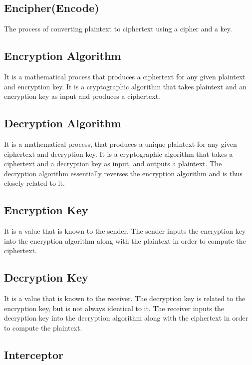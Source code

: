 \documentclass[british]{article}
\begin{document}
\subsection{Encipher(Encode)}

The process of converting plaintext to ciphertext using a cipher and
a key.

\subsection{Encryption Algorithm}

It is a mathematical process that produces a ciphertext for any given
plaintext and encryption key. It is a cryptographic algorithm that
takes plaintext and an encryption key as input and produces a ciphertext.

\subsection{Decryption Algorithm}

It is a mathematical process, that produces a unique plaintext for
any given ciphertext and decryption key. It is a cryptographic algorithm
that takes a ciphertext and a decryption key as input, and outputs
a plaintext. The decryption algorithm essentially reverses the encryption
algorithm and is thus closely related to it.

\subsection{Encryption Key}

It is a value that is known to the sender. The sender inputs the encryption
key into the encryption algorithm along with the plaintext in order
to compute the ciphertext.

\subsection{Decryption Key}

It is a value that is known to the receiver. The decryption key is
related to the encryption key, but is not always identical to it.
The receiver inputs the decryption key into the decryption algorithm
along with the ciphertext in order to compute the plaintext.

\subsection{Interceptor}
\end{document}
